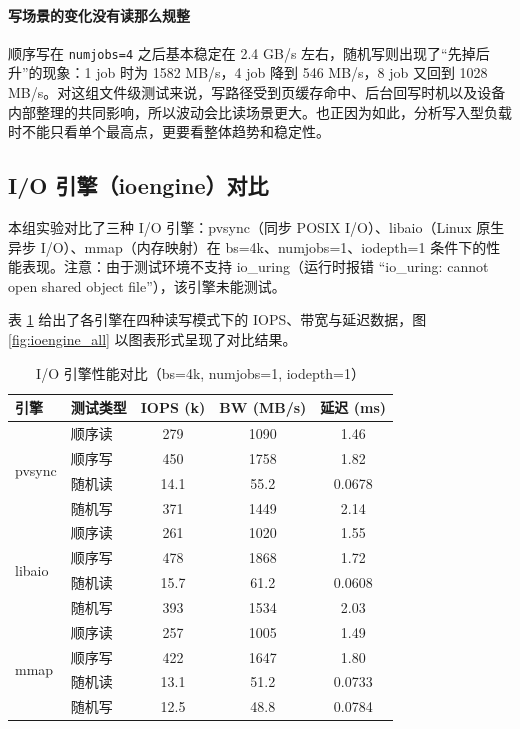 \documentclass[a4paper]{article}
\begin{document}
\paragraph{写场景的变化没有读那么规整}
顺序写在 \texttt{numjobs=4} 之后基本稳定在 2.4 GB/s 左右，随机写则出现了“先掉后升”的现象：1 job 时为 1582 MB/s，4 job 降到 546 MB/s，8 job 又回到 1028 MB/s。对这组文件级测试来说，写路径受到页缓存命中、后台回写时机以及设备内部整理的共同影响，所以波动会比读场景更大。也正因为如此，分析写入型负载时不能只看单个最高点，更要看整体趋势和稳定性。

\subsection{I/O 引擎（ioengine）对比}

本组实验对比了三种 I/O 引擎：pvsync（同步 POSIX I/O）、libaio（Linux 原生异步 I/O）、mmap（内存映射）在 bs=4k、numjobs=1、iodepth=1 条件下的性能表现。注意：由于测试环境不支持 io\_uring（运行时报错 ``io\_uring: cannot open shared object file''），该引擎未能测试。

表 \ref{tab:ioengine} 给出了各引擎在四种读写模式下的 IOPS、带宽与延迟数据，图 \ref{fig:ioengine_all} 以图表形式呈现了对比结果。

\begin{table}[H]
  \centering
  \renewcommand{\arraystretch}{1.25}
  \setlength{\tabcolsep}{10pt}
  \begin{tabular}{llccc}
  \toprule
  \textbf{引擎} & \textbf{测试类型} & \textbf{IOPS (k)} & \textbf{BW (MB/s)} & \textbf{延迟 (ms)} \\
  \midrule
  \multirow{4}{*}{pvsync}
      & 顺序读 & 279  & 1090 & 1.46 \\
      & 顺序写 & 450  & 1758 & 1.82 \\
      & 随机读 & 14.1 & 55.2 & 0.0678 \\
      & 随机写 & 371  & 1449 & 2.14 \\
  \midrule
  \multirow{4}{*}{libaio}
      & 顺序读 & 261  & 1020 & 1.55 \\
      & 顺序写 & 478  & 1868 & 1.72 \\
      & 随机读 & 15.7 & 61.2 & 0.0608 \\
      & 随机写 & 393  & 1534 & 2.03 \\
  \midrule
  \multirow{4}{*}{mmap}
      & 顺序读 & 257  & 1005 & 1.49 \\
      & 顺序写 & 422  & 1647 & 1.80 \\
      & 随机读 & 13.1 & 51.2 & 0.0733 \\
      & 随机写 & 12.5 & 48.8 & 0.0784 \\
  \bottomrule
  \end{tabular}
  \caption{I/O 引擎性能对比（bs=4k, numjobs=1, iodepth=1）}
  \label{tab:ioengine}
\end{table}
\end{document}
